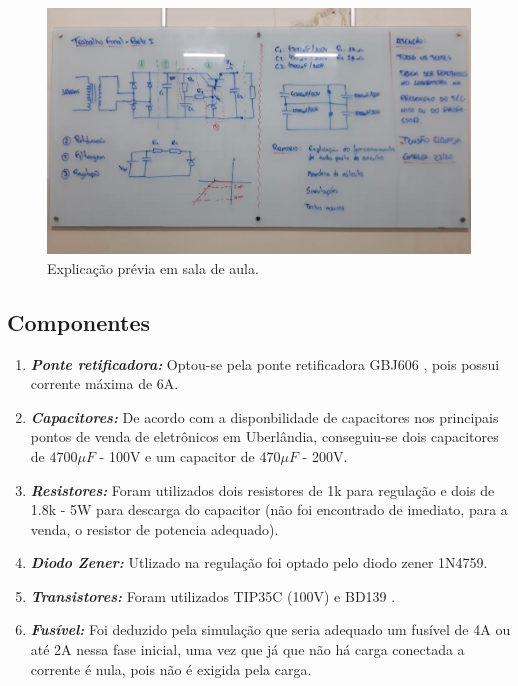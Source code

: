 \documentclass[a4paper,12pt,oneside,openany,table,xcdraw]{article}
\begin{document}
\begin{figure}[H]
\centering
\captionsetup{font=scriptsize}
\includegraphics[width=16cm]{quadro}
\caption{Explicação prévia em sala de aula.}
\label{quadro}
\end{figure}

\subsection{Componentes}
\begin{enumerate}[1 -]
    \item \textbf{\emph{Ponte retificadora:}} Optou-se pela ponte retificadora GBJ606 \cite{GBJ606}, pois possui corrente máxima de 6A.
    \item \textbf{\emph{Capacitores:}} De acordo com a disponbilidade de capacitores nos principais pontos de venda de eletrônicos em Uberlândia, conseguiu-se dois capacitores de $4700\mu F$ - 100V e um capacitor de $470\mu F$ - 200V.
    \item \textbf{\emph{Resistores:}} Foram utilizados dois resistores de 1k para regulação e dois de 1.8k - 5W para descarga do capacitor (não foi encontrado de imediato, para a venda, o resistor de potencia adequado).
    \item \textbf{\emph{Diodo Zener:}} Utlizado na regulação foi optado pelo diodo zener 1N4759.
    \item \textbf{\emph{Transistores:}} Foram utilizados TIP35C (100V) \cite{TIP35} e BD139 \cite{BD139}.
    \item \textbf{\emph{Fusível:}} Foi deduzido pela simulação que seria adequado um fusível de 4A ou até 2A nessa fase inicial, uma vez que já que não há carga conectada a corrente é nula, pois não é exigida pela carga. 

\end{enumerate}
\end{document}

